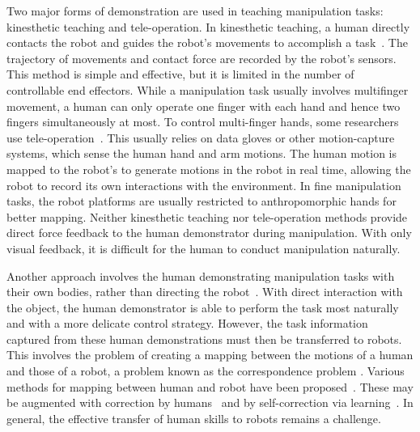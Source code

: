 Two major forms of demonstration are used in teaching manipulation
tasks: kinesthetic teaching and tele-operation. In kinesthetic
teaching, a human directly contacts the robot and guides the robot's
movements to accomplish a
task~\citep{korkinof2013online,pais2014encoding,pastor2011skill,Miao2014}. The
trajectory of movements and contact force are recorded by the robot's
sensors.
This method is simple and effective, but it is limited in the number
of controllable end effectors. %
While a manipulation task usually involves multifinger movement, a
human can only operate one finger with each hand and hence
two fingers simultaneously at most. To control multi-finger hands,
some researchers use
tele-operation~\citep{bernardino2013precision,kondo2008recognition,Fischer98}.
This usually relies on data gloves or other motion-capture systems, which
sense the human hand and arm motions. The human motion is mapped to
the robot's to generate motions in the robot in real time, allowing
the robot to record its own interactions with the
environment. %
In fine manipulation tasks, the robot platforms are usually restricted
to anthropomorphic hands for better mapping.
Neither kinesthetic teaching nor
tele-operation methods provide direct force
feedback to the human demonstrator during manipulation. With only visual feedback,
it is difficult for the human to conduct manipulation naturally.

Another approach involves the human demonstrating manipulation tasks
with their own bodies, rather than directing the
robot~\citep{asfour2008imitation}. With direct interaction with the
object, the human demonstrator is able to perform the task most
naturally and with a more delicate control strategy. However, the task
information captured from these human demonstrations must then be
transferred to robots. This involves the problem of creating a mapping
between the motions of a human and those of a robot, a problem known
as the correspondence problem \citep{Nehaniv02}.
Various methods for mapping between human and
robot have been
proposed~\citep{hueser2006learning,asfour2008imitation,do2011towards}. These
may be augmented with
correction by humans~\citep{calinon2007incremental,sauser2011iterative,romano2011human}
and by self-correction via learning~\citep{bidan2013robio}. %
In general, the effective transfer of human skills to robots 
remains a challenge.

